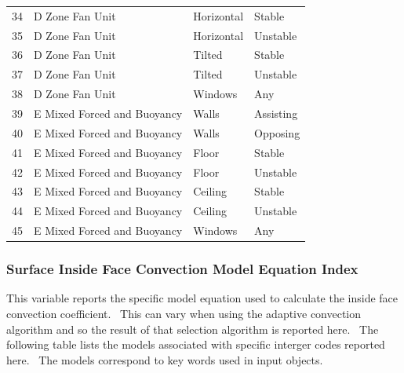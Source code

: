 \begin{longtable}[c]{p{1.5in}p{1.5in}p{1.5in}p{1.5in}}
34 & D Zone Fan Unit & Horizontal & Stable \tabularnewline
35 & D Zone Fan Unit & Horizontal & Unstable \tabularnewline
36 & D Zone Fan Unit & Tilted & Stable \tabularnewline
37 & D Zone Fan Unit & Tilted & Unstable \tabularnewline
38 & D Zone Fan Unit & Windows & Any \tabularnewline
39 & E Mixed Forced and Buoyancy & Walls & Assisting \tabularnewline
40 & E Mixed Forced and Buoyancy & Walls & Opposing \tabularnewline
41 & E Mixed Forced and Buoyancy & Floor & Stable \tabularnewline
42 & E Mixed Forced and Buoyancy & Floor & Unstable \tabularnewline
43 & E Mixed Forced and Buoyancy & Ceiling & Stable \tabularnewline
44 & E Mixed Forced and Buoyancy & Ceiling & Unstable \tabularnewline
45 & E Mixed Forced and Buoyancy & Windows & Any \tabularnewline
\bottomrule
\end{longtable}

\subsubsection{Surface Inside Face Convection Model Equation Index}\label{surface-inside-face-convection-model-equation-index}

This variable reports the specific model equation used to calculate the inside face convection coefficient.~ This can vary when using the adaptive convection algorithm and so the result of that selection algorithm is reported here.~ The following table lists the models associated with specific interger codes reported here.~ The models correspond to key words used in input objects.

